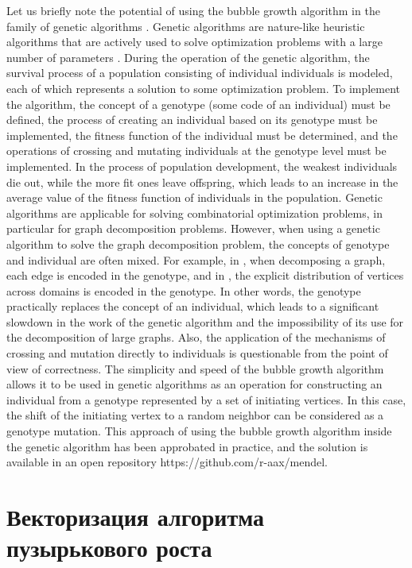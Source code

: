 \documentclass[
11pt,%
tightenlines,%
twoside,%
onecolumn,%
nofloats,%
nobibnotes,%
nofootinbib,%
superscriptaddress,%
noshowpacs,%
centertags]%
{revtex4}
\begin{document}
Let us briefly note the potential of using the bubble growth algorithm in the family of genetic algorithms \cite{20Katosh}.
Genetic algorithms are nature-like heuristic algorithms that are actively used to solve optimization problems with a large number of parameters \cite{21Wirayanti}.
During the operation of the genetic algorithm, the survival process of a population consisting of individual individuals is modeled, each of which represents a solution to some optimization problem.
To implement the algorithm, the concept of a genotype (some code of an individual) must be defined, the process of creating an individual based on its genotype must be implemented, the fitness function of the individual must be determined, and the operations of crossing and mutating individuals at the genotype level must be implemented.
In the process of population development, the weakest individuals die out, while the more fit ones leave offspring, which leads to an increase in the average value of the fitness function of individuals in the population.
Genetic algorithms are applicable for solving combinatorial optimization problems, in particular for graph decomposition problems.
However, when using a genetic algorithm to solve the graph decomposition problem, the concepts of genotype and individual are often mixed.
For example, in \cite{22Chaouche}, when decomposing a graph, each edge is encoded in the genotype, and in \cite{23Li}, the explicit distribution of vertices across domains is encoded in the genotype.
In other words, the genotype practically replaces the concept of an individual, which leads to a significant slowdown in the work of the genetic algorithm and the impossibility of its use for the decomposition of large graphs.
Also, the application of the mechanisms of crossing and mutation directly to individuals is questionable from the point of view of correctness.
The simplicity and speed of the bubble growth algorithm allows it to be used in genetic algorithms as an operation for constructing an individual from a genotype represented by a set of initiating vertices.
In this case, the shift of the initiating vertex to a random neighbor can be considered as a genotype mutation.
This approach of using the bubble growth algorithm inside the genetic algorithm has been approbated in practice, and the solution is available in an open repository https://github.com/r-aax/mendel.

\section{Векторизация алгоритма пузырькового роста}
\end{document}
